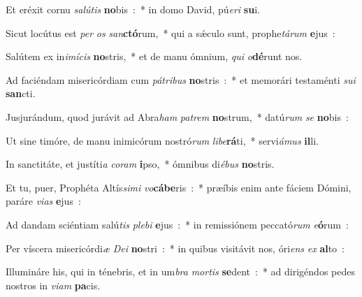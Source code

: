 ﻿\item Et eréxit cornu \emph{sa}\emph{lú}\emph{tis} \textbf{no}bis~:~* in domo David, pú\emph{e}\emph{ri} \textbf{su}i.
\item Sicut locútus est \emph{per} \emph{os} \emph{san}\textbf{ctó}rum,~* qui a sǽculo sunt, prophe\emph{tá}\emph{rum} \textbf{e}jus~:
\item Salútem ex in\emph{i}\emph{mí}\emph{cis} \textbf{no}stris,~* et de manu ómnium, \emph{qui} \emph{o}\textbf{dé}runt nos.
\item Ad faciéndam misericórdiam cum \emph{pá}\emph{tri}\emph{bus} \textbf{no}stris~:~* et memorári testaménti \emph{su}\emph{i} \textbf{san}cti.
\item Jusjurándum, quod jurávit ad Abra\emph{ham} \emph{pa}\emph{trem} \textbf{no}strum,~* datú\emph{rum} \emph{se} \textbf{no}bis~:
\item Ut sine timóre, de manu inimicórum nostró\emph{rum} \emph{li}\emph{be}\textbf{rá}ti,~* servi\emph{á}\emph{mus} \textbf{il}li.
\item In sanctitáte, et justíti\emph{a} \emph{co}\emph{ram} \textbf{i}pso,~* ómnibus di\emph{é}\emph{bus} \textbf{no}stris.
\item Et tu, puer, Prophéta Altís\emph{si}\emph{mi} \emph{vo}\textbf{cá}\textbf{be}ris~:~* præíbis enim ante fáciem Dómini, paráre \emph{vi}\emph{as} \textbf{e}jus~:
\item Ad dandam sciéntiam salú\emph{tis} \emph{ple}\emph{bi} \textbf{e}jus~:~* in remissiónem peccató\emph{rum} \emph{e}\textbf{ó}rum~:
\item Per víscera misericórdi\emph{æ} \emph{De}\emph{i} \textbf{no}stri~:~* in quibus visitávit nos, óri\emph{ens} \emph{ex} \textbf{al}to~:
\item Illumináre his, qui in ténebris, et in um\emph{bra} \emph{mor}\emph{tis} \textbf{se}dent~:~* ad dirigéndos pedes nostros in \emph{vi}\emph{am} \textbf{pa}cis.